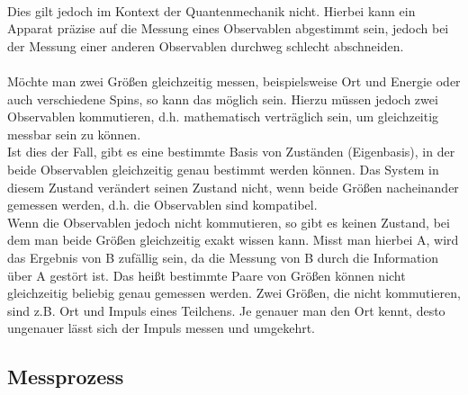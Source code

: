 \\
Dies gilt jedoch im Kontext der Quantenmechanik nicht. Hierbei kann ein Apparat präzise auf die Messung eines Observablen abgestimmt sein, jedoch bei der Messung einer anderen Observablen durchweg schlecht abschneiden. \\ 
\\
Möchte man zwei Größen gleichzeitig messen, beispielsweise Ort und Energie oder auch verschiedene Spins, so kann das möglich sein. Hierzu müssen jedoch zwei Observablen kommutieren, d.h. mathematisch verträglich sein, um gleichzeitig messbar sein zu können. \\
Ist dies der Fall, gibt es eine bestimmte Basis von Zuständen (Eigenbasis), in der beide Observablen gleichzeitig genau bestimmt werden können. Das System in diesem Zustand verändert seinen Zustand nicht, wenn beide Größen nacheinander gemessen werden, d.h. die Observablen sind kompatibel. \\
Wenn die Observablen jedoch nicht kommutieren, so gibt es keinen Zustand, bei dem man beide Größen gleichzeitig exakt wissen kann. Misst man hierbei A, wird das Ergebnis von B zufällig sein, da die Messung von B durch die Information über A gestört ist.
Das heißt bestimmte Paare von Größen können nicht gleichzeitig beliebig genau gemessen werden. 
Zwei Größen, die nicht kommutieren, sind z.B. Ort und Impuls eines Teilchens. Je genauer man den Ort kennt, desto ungenauer lässt sich der Impuls messen und umgekehrt. 
\cite{kasirajan_fundamentals_2021}

\subsection{Messprozess}

